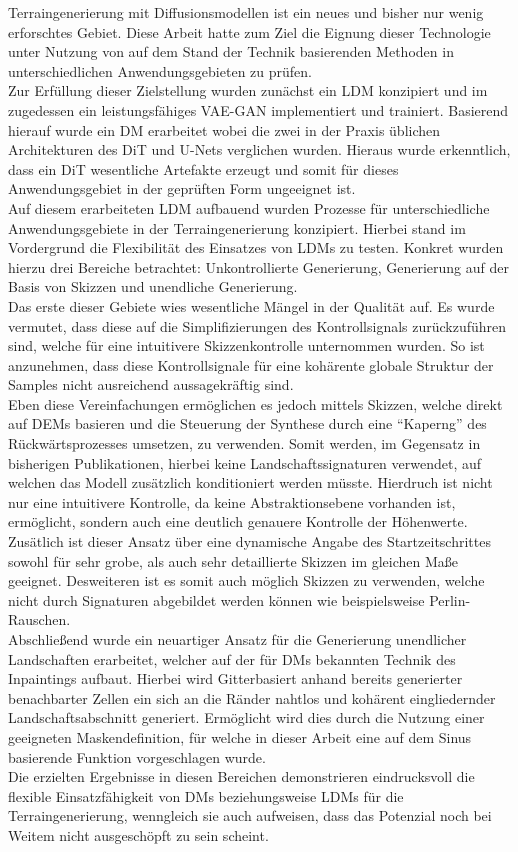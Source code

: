 Terraingenerierung mit Diffusionsmodellen ist ein neues und bisher nur wenig erforschtes Gebiet. Diese Arbeit hatte zum Ziel die Eignung dieser Technologie unter Nutzung von auf dem Stand der Technik basierenden Methoden in unterschiedlichen Anwendungsgebieten zu prüfen. \\
Zur Erfüllung dieser Zielstellung wurden zunächst ein \ac{LDM} konzipiert und im zugedessen ein leistungsfähiges VAE-GAN implementiert und trainiert. Basierend hierauf wurde ein \ac{DM} erarbeitet wobei die zwei in der Praxis üblichen Architekturen des \ac{DiT} und U-Nets verglichen wurden. Hieraus wurde erkenntlich, dass ein \ac{DiT} wesentliche Artefakte erzeugt und somit für dieses Anwendungsgebiet in der geprüften Form ungeeignet ist. \\
Auf diesem erarbeiteten \ac{LDM} aufbauend wurden Prozesse für unterschiedliche Anwendungsgebiete in der Terraingenerierung konzipiert. Hierbei stand im Vordergrund die Flexibilität des Einsatzes von \ac{LDM}s zu testen. Konkret wurden hierzu drei Bereiche betrachtet: Unkontrollierte Generierung, Generierung auf der Basis von Skizzen und unendliche Generierung. \\
Das erste dieser Gebiete wies wesentliche Mängel in der Qualität auf. Es wurde vermutet, dass diese auf die Simplifizierungen des Kontrollsignals zurückzuführen sind, welche für eine intuitivere Skizzenkontrolle unternommen wurden. So ist anzunehmen, dass diese Kontrollsignale für eine kohärente globale Struktur der Samples nicht ausreichend aussagekräftig sind. \\
Eben diese Vereinfachungen ermöglichen es jedoch mittels Skizzen, welche direkt auf \ac{DEM}s basieren und die Steuerung der Synthese durch eine \enquote{Kaperng} des Rückwärtsprozesses umsetzen, zu verwenden. Somit werden, im Gegensatz in bisherigen Publikationen, hierbei keine Landschaftssignaturen verwendet, auf welchen das Modell zusätzlich konditioniert werden müsste. Hierdruch ist nicht nur eine intuitivere Kontrolle, da keine Abstraktionsebene vorhanden ist, ermöglicht, sondern auch eine deutlich genauere Kontrolle der Höhenwerte. Zusätlich ist dieser Ansatz über eine dynamische Angabe des Startzeitschrittes sowohl für sehr grobe, als auch sehr detaillierte Skizzen im gleichen Maße geeignet. Desweiteren ist es somit auch möglich Skizzen zu verwenden, welche nicht durch Signaturen abgebildet werden können wie beispielsweise Perlin-Rauschen. \\
Abschließend wurde ein neuartiger Ansatz für die Generierung unendlicher Landschaften erarbeitet, welcher auf der für \ac{DM}s bekannten Technik des Inpaintings aufbaut. Hierbei wird Gitterbasiert anhand bereits generierter benachbarter Zellen ein sich an die Ränder nahtlos und kohärent eingliedernder Landschaftsabschnitt generiert. Ermöglicht wird dies durch die Nutzung einer geeigneten Maskendefinition, für welche in dieser Arbeit eine auf dem Sinus basierende Funktion vorgeschlagen wurde. \\
Die erzielten Ergebnisse in diesen Bereichen demonstrieren eindrucksvoll die flexible Einsatzfähigkeit von \ac{DM}s beziehungsweise \ac{LDM}s für die Terraingenerierung, wenngleich sie auch aufweisen, dass das Potenzial noch bei Weitem nicht ausgeschöpft zu sein scheint.



